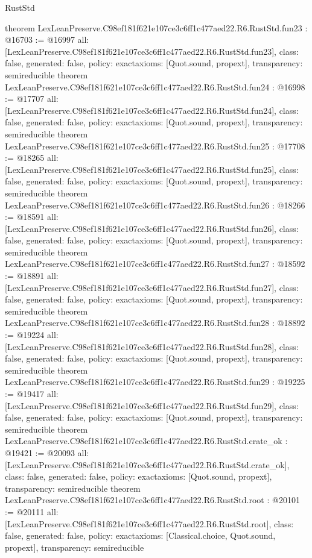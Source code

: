 \begin{lexlean}{RustStd}
\begin{coremodule}
{}
theorem LexLeanPreserve.C98ef181f621e107ce3c6ff1c477aed22.R6.RustStd.fun23 : @16703 := @16997 {
  all: [LexLeanPreserve.C98ef181f621e107ce3c6ff1c477aed22.R6.RustStd.fun23],
  class: false,
  generated: false,
  policy: exact{axioms: [Quot.sound, propext]},
  transparency: semireducible
}
theorem LexLeanPreserve.C98ef181f621e107ce3c6ff1c477aed22.R6.RustStd.fun24 : @16998 := @17707 {
  all: [LexLeanPreserve.C98ef181f621e107ce3c6ff1c477aed22.R6.RustStd.fun24],
  class: false,
  generated: false,
  policy: exact{axioms: [Quot.sound, propext]},
  transparency: semireducible
}
theorem LexLeanPreserve.C98ef181f621e107ce3c6ff1c477aed22.R6.RustStd.fun25 : @17708 := @18265 {
  all: [LexLeanPreserve.C98ef181f621e107ce3c6ff1c477aed22.R6.RustStd.fun25],
  class: false,
  generated: false,
  policy: exact{axioms: [Quot.sound, propext]},
  transparency: semireducible
}
theorem LexLeanPreserve.C98ef181f621e107ce3c6ff1c477aed22.R6.RustStd.fun26 : @18266 := @18591 {
  all: [LexLeanPreserve.C98ef181f621e107ce3c6ff1c477aed22.R6.RustStd.fun26],
  class: false,
  generated: false,
  policy: exact{axioms: [Quot.sound, propext]},
  transparency: semireducible
}
theorem LexLeanPreserve.C98ef181f621e107ce3c6ff1c477aed22.R6.RustStd.fun27 : @18592 := @18891 {
  all: [LexLeanPreserve.C98ef181f621e107ce3c6ff1c477aed22.R6.RustStd.fun27],
  class: false,
  generated: false,
  policy: exact{axioms: [Quot.sound, propext]},
  transparency: semireducible
}
theorem LexLeanPreserve.C98ef181f621e107ce3c6ff1c477aed22.R6.RustStd.fun28 : @18892 := @19224 {
  all: [LexLeanPreserve.C98ef181f621e107ce3c6ff1c477aed22.R6.RustStd.fun28],
  class: false,
  generated: false,
  policy: exact{axioms: [Quot.sound, propext]},
  transparency: semireducible
}
theorem LexLeanPreserve.C98ef181f621e107ce3c6ff1c477aed22.R6.RustStd.fun29 : @19225 := @19417 {
  all: [LexLeanPreserve.C98ef181f621e107ce3c6ff1c477aed22.R6.RustStd.fun29],
  class: false,
  generated: false,
  policy: exact{axioms: [Quot.sound, propext]},
  transparency: semireducible
}
theorem LexLeanPreserve.C98ef181f621e107ce3c6ff1c477aed22.R6.RustStd.crate_ok : @19421 := @20093 {
  all: [LexLeanPreserve.C98ef181f621e107ce3c6ff1c477aed22.R6.RustStd.crate_ok],
  class: false,
  generated: false,
  policy: exact{axioms: [Quot.sound, propext]},
  transparency: semireducible
}
theorem LexLeanPreserve.C98ef181f621e107ce3c6ff1c477aed22.R6.RustStd.root : @20101 := @20111 {
  all: [LexLeanPreserve.C98ef181f621e107ce3c6ff1c477aed22.R6.RustStd.root],
  class: false,
  generated: false,
  policy: exact{axioms: [Classical.choice, Quot.sound, propext]},
  transparency: semireducible
}


\end{coremodule}
\end{lexlean}

